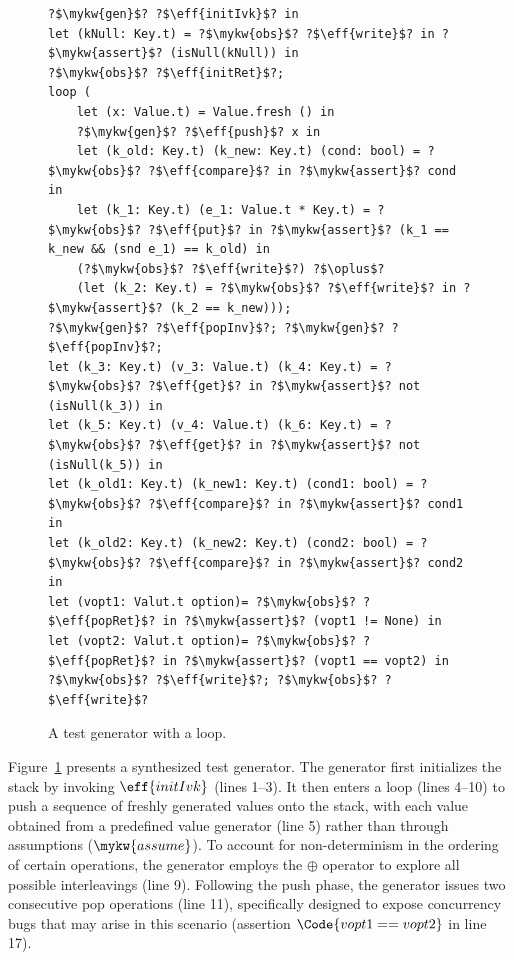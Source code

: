 \begin{figure}[h!]
\centering
\begin{verbatim}
?$\mykw{gen}$? ?$\eff{initIvk}$? in
let (kNull: Key.t) = ?$\mykw{obs}$? ?$\eff{write}$? in ?$\mykw{assert}$? (isNull(kNull)) in 
?$\mykw{obs}$? ?$\eff{initRet}$?;
loop (
    let (x: Value.t) = Value.fresh () in
    ?$\mykw{gen}$? ?$\eff{push}$? x in
    let (k_old: Key.t) (k_new: Key.t) (cond: bool) = ?$\mykw{obs}$? ?$\eff{compare}$? in ?$\mykw{assert}$? cond in
    let (k_1: Key.t) (e_1: Value.t * Key.t) = ?$\mykw{obs}$? ?$\eff{put}$? in ?$\mykw{assert}$? (k_1 == k_new && (snd e_1) == k_old) in
    (?$\mykw{obs}$? ?$\eff{write}$?) ?$\oplus$?
    (let (k_2: Key.t) = ?$\mykw{obs}$? ?$\eff{write}$? in ?$\mykw{assert}$? (k_2 == k_new)));
?$\mykw{gen}$? ?$\eff{popInv}$?; ?$\mykw{gen}$? ?$\eff{popInv}$?;
let (k_3: Key.t) (v_3: Value.t) (k_4: Key.t) = ?$\mykw{obs}$? ?$\eff{get}$? in ?$\mykw{assert}$? not (isNull(k_3)) in
let (k_5: Key.t) (v_4: Value.t) (k_6: Key.t) = ?$\mykw{obs}$? ?$\eff{get}$? in ?$\mykw{assert}$? not (isNull(k_5)) in
let (k_old1: Key.t) (k_new1: Key.t) (cond1: bool) = ?$\mykw{obs}$? ?$\eff{compare}$? in ?$\mykw{assert}$? cond1 in
let (k_old2: Key.t) (k_new2: Key.t) (cond2: bool) = ?$\mykw{obs}$? ?$\eff{compare}$? in ?$\mykw{assert}$? cond2 in
let (vopt1: Valut.t option)= ?$\mykw{obs}$? ?$\eff{popRet}$? in ?$\mykw{assert}$? (vopt1 != None) in
let (vopt2: Valut.t option)= ?$\mykw{obs}$? ?$\eff{popRet}$? in ?$\mykw{assert}$? (vopt1 == vopt2) in
?$\mykw{obs}$? ?$\eff{write}$?; ?$\mykw{obs}$? ?$\eff{write}$?
\end{verbatim}
\caption{A test generator with a loop. }\label{fig:treiber-stack-gen}
\end{figure}

Figure~\ref{fig:treiber-stack-gen} presents a synthesized test generator. The generator first initializes the stack by invoking $\eff{initIvk}$ (lines 1--3). It then enters a loop (lines 4--10) to push a sequence of freshly generated values onto the stack, with each value obtained from a predefined value generator (line 5) rather than through assumptions ($\mykw{assume}$). To account for non-determinism in the ordering of certain operations, the generator employs the $\oplus$ operator to explore all possible interleavings (line 9). Following the push phase, the generator issues two consecutive pop operations (line 11), specifically designed to expose concurrency bugs that may arise in this scenario (assertion $\Code{vopt1 == vopt2}$ in line 17).

